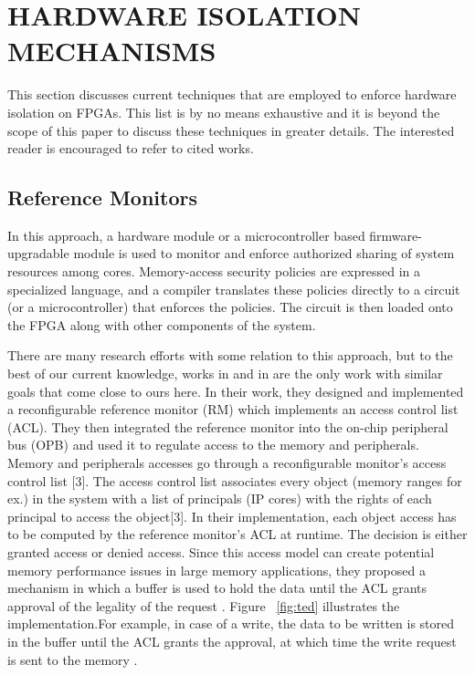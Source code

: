 \documentclass[sigconf]{acmart}
\theoremstyle{plain}
\theoremstyle{remark}
\begin{document}
\section{HARDWARE ISOLATION MECHANISMS} \label{sec:problem_definition}

This section discusses current techniques that are employed to enforce hardware isolation on FPGAs. This list is by no means exhaustive and it is beyond the scope of this paper to discuss these techniques in greater details. The interested reader is encouraged to refer to cited works. 


\subsection{Reference Monitors}

In this approach, a hardware module or a microcontroller based firmware-upgradable module is used to monitor and enforce authorized sharing of system
resources among cores. Memory-access security policies are expressed in a specialized language, and a compiler translates these policies directly to a circuit (or a microcontroller) that enforces the policies. The circuit is then loaded onto the FPGA along with other components of the system.

There are many research efforts with some relation to this approach, but to the best of our current knowledge, works in \cite{HuffEmbedded} and in \cite{Huffmire} are the only work with similar goals that come close to ours here. In their work, they designed and implemented a reconfigurable reference monitor (RM) which implements an access control list (ACL). They then integrated the reference monitor into the on-chip peripheral bus (OPB) and used it to regulate access to the memory and peripherals. Memory and peripherals accesses go through a reconfigurable monitor's access control list [3]. The access control list associates every object (memory ranges for ex.) in the system with a list of principals (IP cores) with the rights of each principal to access the object[3]. In their implementation, each object access has to be computed by the reference monitor's ACL at runtime. The decision is either granted access or denied access. Since this access model can create potential memory performance issues in large memory applications, they proposed a mechanism in which a buffer is used to hold the data until the ACL grants approval of the legality of the request \cite{SPHuffmire}. Figure ~\ref{fig:ted} illustrates the implementation.For example, in case of a write, the data to be written is stored in the buffer until the ACL grants the approval, at which time the write request is sent to the memory \cite{SPHuffmire}.
\end{document}
